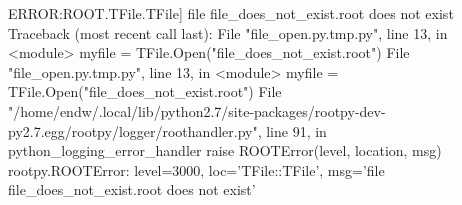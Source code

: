 \begin{footnotesize}
\begin{pyglist}[language=text,texcl=true,abovecaptionskip=0,style=bw]
ERROR:ROOT.TFile.TFile] file file_does_not_exist.root does not exist
Traceback (most recent call last):
  File "file_open.py.tmp.py", line 13, in <module>
    myfile = TFile.Open("file_does_not_exist.root")
  File "file_open.py.tmp.py", line 13, in <module>
    myfile = TFile.Open("file_does_not_exist.root")
  File "/home/endw/.local/lib/python2.7/site-packages/rootpy-dev-py2.7.egg/rootpy/logger/roothandler.py", line 91, in python_logging_error_handler
    raise ROOTError(level, location, msg)
rootpy.ROOTError: level=3000, loc='TFile::TFile', msg='file file_does_not_exist.root does not exist'
\end{pyglist}
\end{footnotesize}
